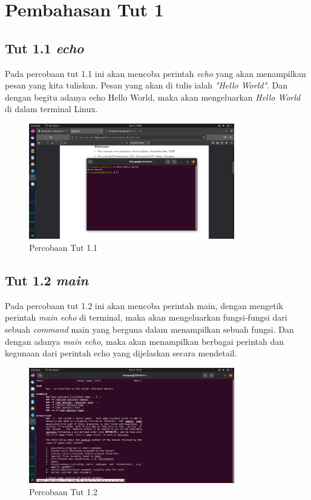 \documentclass[11pt,a4paper]{article}
\begin{document}
\section{Pembahasan Tut 1}
\subsection{Tut 1.1 \textit{echo}}
	Pada percobaan tut 1.1 ini akan mencoba perintah \textit{echo} yang akan menampilkan pesan yang kita tuliskan. Pesan yang akan 
	di tulis ialah \textit{"Hello World"}. Dan dengan begitu adanya echo Hello World, maka akan mengeluarkan \textit{Hello World} 
	di dalam terminal Linux.
	\begin{figure}[h]
		\centering
		\includegraphics[width=0.8\textwidth]{Figure/tut 1.1.png}
		\caption{Percobaan Tut 1.1}
	\end{figure}

\subsection{Tut 1.2 \textit{main}}
    Pada percobaan tut 1.2 ini akan mencoba perintah main, dengan mengetik perintah \textit{main echo} di terminal, maka akan 
	mengeluarkan fungsi-fungsi dari sebuah \textit{command} main yang berguna dalam menampilkan sebuah fungsi. Dan dengan adanya \textit{main echo},
	maka akan menampilkan berbagai perintah dan kegunaan dari perintah echo yang dijelaskan secara mendetail.
	\begin{figure}[h]
		\centering
		\includegraphics[width=0.8\textwidth]{Figure/tut 1.2.png}
		\caption{Percobaan Tut 1.2}
	\end{figure}
\end{document}
